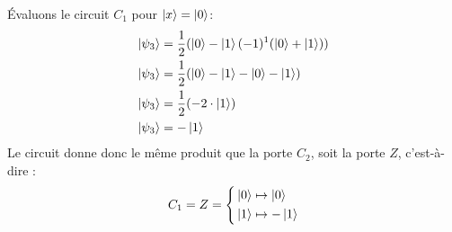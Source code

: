 \documentclass{article}
\begin{document}
Évaluons le circuit $C_1$ pour $\ket{x} = \ket{0}$:
\begin{align*}
\ket{\psi_3} &= \frac{1}{2}(\ket{0} - \ket{1} (-1)^1(\ket{0} + \ket{1})) \\
\ket{\psi_3} &= \frac{1}{2}(\ket{0} - \ket{1} - \ket{0} - \ket{1}) \\
\ket{\psi_3} &= \frac{1}{2}(-2 \cdot \ket{1}) \\
\ket{\psi_3} &= -\ket{1}
\end{align*}
Le circuit donne donc le même produit que la porte $C_2$, soit la porte $Z$, c'est-à-dire : 
\[
C_1 = Z = 
    \left\{
        \begin{aligned}
            &\ket{0} \mapsto \ket{0}\\
            &\ket{1} \mapsto -\ket{1}
        \end{aligned}
    \right .
\] \\
\end{document}
